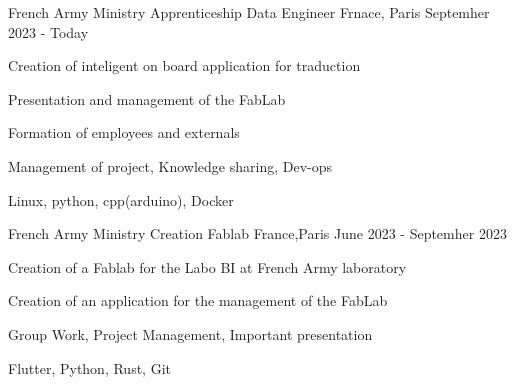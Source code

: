 

\begin{cventries}

	\cventry
	{French Army Ministry} %
	{Apprenticeship Data Engineer} %
	{Frnace, Paris} %
	{Septemher 2023 - Today} %
	{
		\begin{cvitems} %
			\item {Creation of inteligent on board application for traduction}
			\item {Presentation and management of the FabLab}
			\item {Formation of employees and externals}
		\end{cvitems}
	}
	{
		\begin{cvitemsskills} %
			\item {Management of project, Knowledge sharing, Dev-ops}
			\item {Linux, python, cpp(arduino), Docker }
		\end{cvitemsskills}
	}

	\cventry
	{French Army Ministry} %
	{Creation Fablab} %
	{France,Paris} %
	{June 2023 - Septemher 2023} %
	{
		\begin{cvitems} %
			\item {Creation of a Fablab for the Labo BI at French Army laboratory}
			\item {Creation of an application for the management of the FabLab}
		\end{cvitems}
	}
	{
		\begin{cvitemsskills} %
			\item {Group Work, Project Management, Important presentation}
			\item {Flutter, Python, Rust, Git }
		\end{cvitemsskills}
	}


\end{cventries}
